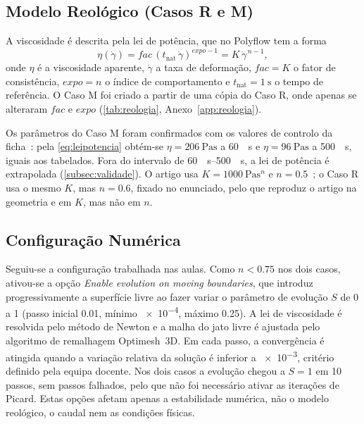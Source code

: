 \subsection{Modelo Reológico (Casos R e M)}
\label{subsec:reologia}

A viscosidade é descrita pela lei de potência, que no Polyflow tem a forma
\begin{equation}
    \eta(\dot{\gamma}) = \mathit{fac}\,(t_{\mathrm{nat}}\,\dot{\gamma})^{\mathit{expo}-1} = K\,\dot{\gamma}^{\,n-1},
    \label{eq:leipotencia}
\end{equation}
onde $\eta$ é a viscosidade aparente, $\dot{\gamma}$ a taxa de deformação, $\mathit{fac} = K$ o fator de consistência, $\mathit{expo} = n$ o índice de comportamento e $t_{\mathrm{nat}} = \qty{1}{\second}$ o tempo de referência. O Caso M foi criado a partir de uma cópia do Caso R, onde apenas se alteraram $\mathit{fac}$ e $\mathit{expo}$ (\autoref{tab:reologia}, Anexo~\ref{app:reologia}).

Os parâmetros do Caso M foram confirmados com os valores de controlo da ficha~\cite{FichaMoplen}: pela \autoref{eq:leipotencia} obtém-se $\eta = \qty{206}{\pascal\second}$ a \qty{60}{\per\second} e $\eta = \qty{96}{\pascal\second}$ a \qty{500}{\per\second}, iguais aos tabelados. Fora do intervalo de \qtyrange{60}{500}{\per\second}, a lei de potência é extrapolada (\autoref{subsec:validade}). O artigo usa $K = \qty{1000}{\pascal\second\tothe{n}}$ e $n = \num{0,5}$~\cite{Zhang2026Anisotropic}; o Caso R usa o mesmo $K$, mas $n = \num{0,6}$, fixado no enunciado, pelo que reproduz o artigo na geometria e em $K$, mas não em $n$.



\subsection{Configuração Numérica}
\label{subsec:numerica}

Seguiu-se a configuração trabalhada nas aulas. Como $n < \num{0,75}$ nos dois casos, ativou-se a opção \textit{Enable evolution on moving boundaries}, que introduz progressivamente a superfície livre ao fazer variar o parâmetro de evolução $S$ de 0 a 1 (passo inicial \num{0,01}, mínimo \num{e-4}, máximo \num{0,25}). A lei de viscosidade é resolvida pelo método de Newton e a malha do jato livre é ajustada pelo algoritmo de remalhagem Optimesh~3D. Em cada passo, a convergência é atingida quando a variação relativa da solução é inferior a \num{e-3}, critério definido pela equipa docente. Nos dois casos a evolução chegou a $S = 1$ em 10 passos, sem passos falhados, pelo que não foi necessário ativar as iterações de Picard. Estas opções afetam apenas a estabilidade numérica, não o modelo reológico, o caudal nem as condições físicas.



